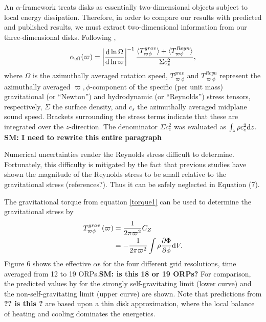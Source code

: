 \documentclass[manuscript]{aastex} %
\begin{document}
An $\alpha$-framework treats disks as essentially two-dimensional objects subject to local energy dissipation.  Therefore, in order to compare our results with predicted and published results, we must extract two-dimensional information from our three-dimensional disks.  Following \citet{lodato2004}, 
\begin{equation}
\alpha_{\rm{eff}}(\varpi) = \left| \frac{{\rm d} \ln \Omega}{{\rm d} \ln \varpi} \right|^{-1} 
\frac {\langle T_{\varpi\phi}^{grav}\rangle + \langle T_{\varpi\phi}^{Reyn}\rangle}
{\Sigma c_s^2},
\end{equation}
where $\Omega$ is the azimuthally averaged rotation speed, $T_{\varpi\phi}^{grav}$ and $T_{\varpi\phi}^{Reyn}$ represent the azimuthally averaged $\varpi,\phi$-component of the specific (per unit mass) gravitational 
(or ``Newton'') and hydrodynamic (or ``Reynolds'') stress tensors, respectively, $\Sigma$ the surface density,
and $c_s$ the azimuthally averaged midplane sound speed.  Brackets surrounding the stress terms indicate that these are integrated over the $z$-direction. The denominator $\Sigma c_c^2$ was evaluated as $\int_z \rho c_c^2 {\rm d}z$. {\bf SM: I need to rewrite this entire paragraph}
 
Numerical uncertainties render the Reynolds stress difficult to determine. Fortunately, this difficulty is mitigated by the fact that previous studies have shown the magnitude of the Reynolds stress to be small relative to the gravitational stress (references?).
Thus it can be safely neglected in Equation (7).

The gravitational torque from equation \ref{torque1} can be used to determine the
gravitational stress by
\begin{equation}
\begin{split}
 T_{\varpi\phi}^{grav}\left( \varpi \right) & = \frac{1}{2\pi\varpi^2}C_Z\\
                                & = - \frac{1}{2\pi\varpi^2} \int \rho\frac{\partial\Phi}{\partial\phi} {\rm d}V.
\end{split}
\end{equation}
Figure 6 shows the effective $\alpha$s for the four different grid resolutions, time averaged from 12 to 19 ORPs.{\bf SM: is this 18 or 19 ORPs?} For comparison, the predicted values by \citet{gammie2001} for the strongly self-gravitating limit (lower curve) and the non-self-gravitating limit (upper curve) are shown. Note that predictions from {\bf ?? is this \citep{gammie2001}?} are based upon a thin
disk approximation, where the local balance of heating and cooling dominates the energetics.
\end{document}
